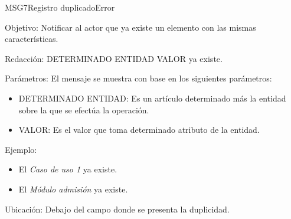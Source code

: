 \begin{mensaje}{MSG7}{Registro duplicado}{Error}
	\item [Objetivo:] Notificar al actor que ya existe un elemento con las mismas características.
	\item[Redacción:] DETERMINADO ENTIDAD VALOR ya existe.
	\item[Parámetros:] El mensaje se muestra con base en los siguientes parámetros:
		\begin{itemize}
 			\item DETERMINADO ENTIDAD: Es un artículo determinado más la entidad sobre la que se efectúa la operación.
 			\item VALOR: Es el valor que toma determinado atributo de la entidad.
		\end{itemize}
	\item[Ejemplo:] \begin{itemize}
		\item El {\em Caso de uso 1} ya existe.
		\item El {\em Módulo admisión} ya existe.
	\end{itemize}
	\item [Ubicación:] Debajo del campo donde se presenta la duplicidad.
\end{mensaje}